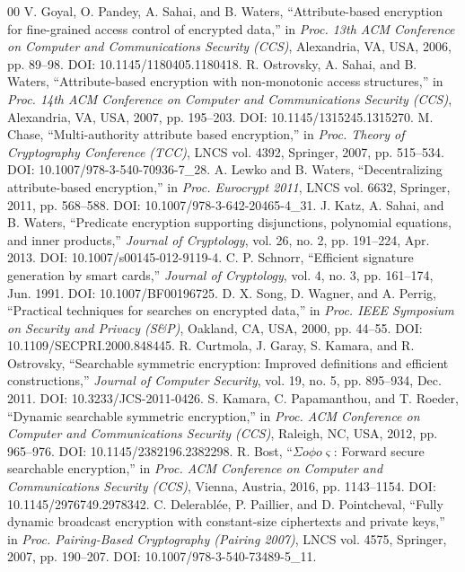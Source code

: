 \documentclass[conference]{IEEEtran}
\begin{document}
\begin{thebibliography}{00}
 V. Goyal, O. Pandey, A. Sahai, and B. Waters, ``Attribute-based encryption for fine-grained access control of encrypted data,'' in \textit{Proc. 13th ACM Conference on Computer and Communications Security (CCS)}, Alexandria, VA, USA, 2006, pp. 89--98. DOI: 10.1145/1180405.1180418.
 R. Ostrovsky, A. Sahai, and B. Waters, ``Attribute-based encryption with non-monotonic access structures,'' in \textit{Proc. 14th ACM Conference on Computer and Communications Security (CCS)}, Alexandria, VA, USA, 2007, pp. 195--203. DOI: 10.1145/1315245.1315270.
 M. Chase, ``Multi-authority attribute based encryption,'' in \textit{Proc. Theory of Cryptography Conference (TCC)}, LNCS vol. 4392, Springer, 2007, pp. 515--534. DOI: 10.1007/978-3-540-70936-7\_28.
 A. Lewko and B. Waters, ``Decentralizing attribute-based encryption,'' in \textit{Proc. Eurocrypt 2011}, LNCS vol. 6632, Springer, 2011, pp. 568--588. DOI: 10.1007/978-3-642-20465-4\_31.
 J. Katz, A. Sahai, and B. Waters, ``Predicate encryption supporting disjunctions, polynomial equations, and inner products,'' \textit{Journal of Cryptology}, vol. 26, no. 2, pp. 191--224, Apr. 2013. DOI: 10.1007/s00145-012-9119-4.
 C. P. Schnorr, ``Efficient signature generation by smart cards,'' \textit{Journal of Cryptology}, vol. 4, no. 3, pp. 161--174, Jun. 1991. DOI: 10.1007/BF00196725.
 D. X. Song, D. Wagner, and A. Perrig, ``Practical techniques for searches on encrypted data,'' in \textit{Proc. IEEE Symposium on Security and Privacy (S\&P)}, Oakland, CA, USA, 2000, pp. 44--55. DOI: 10.1109/SECPRI.2000.848445.
 R. Curtmola, J. Garay, S. Kamara, and R. Ostrovsky, ``Searchable symmetric encryption: Improved definitions and efficient constructions,'' \textit{Journal of Computer Security}, vol. 19, no. 5, pp. 895--934, Dec. 2011. DOI: 10.3233/JCS-2011-0426.
 S. Kamara, C. Papamanthou, and T. Roeder, ``Dynamic searchable symmetric encryption,'' in \textit{Proc. ACM Conference on Computer and Communications Security (CCS)}, Raleigh, NC, USA, 2012, pp. 965--976. DOI: 10.1145/2382196.2382298.
 R. Bost, ``$\Sigma o \phi o \varsigma$: Forward secure searchable encryption,'' in \textit{Proc. ACM Conference on Computer and Communications Security (CCS)}, Vienna, Austria, 2016, pp. 1143--1154. DOI: 10.1145/2976749.2978342.
 C. Delerabl{\'e}e, P. Paillier, and D. Pointcheval, ``Fully dynamic broadcast encryption with constant-size ciphertexts and private keys,'' in \textit{Proc. Pairing-Based Cryptography (Pairing 2007)}, LNCS vol. 4575, Springer, 2007, pp. 190--207. DOI: 10.1007/978-3-540-73489-5\_11.

\end{thebibliography}
\end{document}
